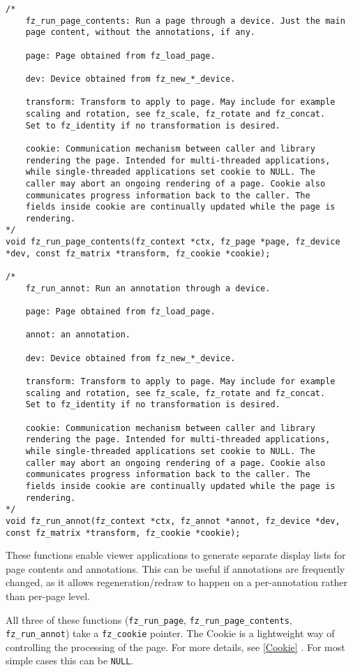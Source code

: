 \documentclass[oneside]{book}
\newcommand{\rjwref}[1] {\autoref{#1} \nameref{#1}}
\begin{document}
\begin{lstlisting}
/*
	fz_run_page_contents: Run a page through a device. Just the main
	page content, without the annotations, if any.

	page: Page obtained from fz_load_page.

	dev: Device obtained from fz_new_*_device.

	transform: Transform to apply to page. May include for example
	scaling and rotation, see fz_scale, fz_rotate and fz_concat.
	Set to fz_identity if no transformation is desired.

	cookie: Communication mechanism between caller and library
	rendering the page. Intended for multi-threaded applications,
	while single-threaded applications set cookie to NULL. The
	caller may abort an ongoing rendering of a page. Cookie also
	communicates progress information back to the caller. The
	fields inside cookie are continually updated while the page is
	rendering.
*/
void fz_run_page_contents(fz_context *ctx, fz_page *page, fz_device *dev, const fz_matrix *transform, fz_cookie *cookie);

/*
	fz_run_annot: Run an annotation through a device.

	page: Page obtained from fz_load_page.

	annot: an annotation.

	dev: Device obtained from fz_new_*_device.

	transform: Transform to apply to page. May include for example
	scaling and rotation, see fz_scale, fz_rotate and fz_concat.
	Set to fz_identity if no transformation is desired.

	cookie: Communication mechanism between caller and library
	rendering the page. Intended for multi-threaded applications,
	while single-threaded applications set cookie to NULL. The
	caller may abort an ongoing rendering of a page. Cookie also
	communicates progress information back to the caller. The
	fields inside cookie are continually updated while the page is
	rendering.
*/
void fz_run_annot(fz_context *ctx, fz_annot *annot, fz_device *dev, const fz_matrix *transform, fz_cookie *cookie);
\end{lstlisting}

These functions enable viewer applications to generate separate display lists for page contents and annotations. This can be useful if annotations are frequently changed, as it allows regeneration/redraw to happen on a per-annotation rather than per-page level.

All three of these functions (\texttt{fz\_run\_page}, \texttt{fz\_run\_page\_contents}, \texttt{fz\_run\_annot}) take a \texttt{fz\_cookie} pointer. The Cookie is a lightweight way of controlling the processing of the page. For more details, see \rjwref{Cookie}. For most simple cases this can be \texttt{NULL}.
\end{document}
